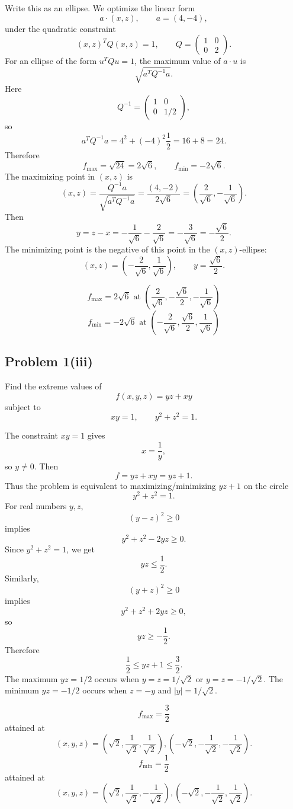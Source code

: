 \documentclass[11pt,a4paper]{article}
\begin{document}
Write this as an ellipse.  We optimize the linear form
\[
 a\cdot (x,z),\qquad a=(4,-4),
\]
under the quadratic constraint
\[
 (x,z)^TQ(x,z)=1,
\qquad Q=\begin{pmatrix}1&0\\0&2\end{pmatrix}.
\]
For an ellipse of the form \(u^TQu=1\), the maximum value of \(a\cdot u\) is
\[
 \sqrt{a^TQ^{-1}a}.
\]
Here
\[
 Q^{-1}=\begin{pmatrix}1&0\\0&1/2\end{pmatrix},
\]
so
\[
 a^TQ^{-1}a=4^2+(-4)^2\frac12=16+8=24.
\]
Therefore
\[
 f_{\max}=\sqrt{24}=2\sqrt6,
\qquad f_{\min}=-2\sqrt6.
\]
The maximizing point in \((x,z)\) is
\[
 (x,z)=\frac{Q^{-1}a}{\sqrt{a^TQ^{-1}a} }
 =\frac{(4,-2)}{2\sqrt6}
 =\left(\frac{2}{\sqrt6},-\frac{1}{\sqrt6}\right).
\]
Then
\[
 y=z-x=-\frac{1}{\sqrt6}-\frac{2}{\sqrt6}=-\frac{3}{\sqrt6}=-\frac{\sqrt6}{2}.
\]
The minimizing point is the negative of this point in the \((x,z)\)-ellipse:
\[
 (x,z)=\left(-\frac{2}{\sqrt6},\frac{1}{\sqrt6}\right),
\qquad y=\frac{\sqrt6}{2}.
\]

\begin{answerbox}
\[
\boxed{f_{\max}=2\sqrt6\text{ at }\left(\frac{2}{\sqrt6},-\frac{\sqrt6}{2},-\frac{1}{\sqrt6}\right)}
\]
\[
\boxed{f_{\min}=-2\sqrt6\text{ at }\left(-\frac{2}{\sqrt6},\frac{\sqrt6}{2},\frac{1}{\sqrt6}\right)}
\]
\end{answerbox}

\subsection{Problem 1(iii)}
Find the extreme values of
\[
 f(x,y,z)=yz+xy
\]
subject to
\[
 xy=1,
\qquad y^2+z^2=1.
\]

The constraint \(xy=1\) gives
\[
 x=\frac1y,
\]
so \(y\neq0\).  Then
\[
 f=yz+xy=yz+1.
\]
Thus the problem is equivalent to maximizing/minimizing \(yz+1\) on the circle
\[
 y^2+z^2=1.
\]
For real numbers \(y,z\),
\[
 (y-z)^2\ge0
\]
implies
\[
 y^2+z^2-2yz\ge0.
\]
Since \(y^2+z^2=1\), we get
\[
 yz\le \frac12.
\]
Similarly,
\[
 (y+z)^2\ge0
\]
implies
\[
 y^2+z^2+2yz\ge0,
\]
so
\[
 yz\ge -\frac12.
\]
Therefore
\[
 \frac12\le yz+1\le \frac32.
\]
The maximum \(yz=1/2\) occurs when \(y=z=1/\sqrt2\) or \(y=z=-1/\sqrt2\).  The minimum \(yz=-1/2\) occurs when \(z=-y\) and \(|y|=1/\sqrt2\).

\begin{answerbox}
\[
\boxed{f_{\max}=\frac32}
\]
attained at
\[
\boxed{(x,y,z)=\left(\sqrt2,\frac1{\sqrt2},\frac1{\sqrt2}\right),
\left(-\sqrt2,-\frac1{\sqrt2},-\frac1{\sqrt2}\right)}.
\]
\[
\boxed{f_{\min}=\frac12}
\]
attained at
\[
\boxed{(x,y,z)=\left(\sqrt2,\frac1{\sqrt2},-\frac1{\sqrt2}\right),
\left(-\sqrt2,-\frac1{\sqrt2},\frac1{\sqrt2}\right)}.
\]
\end{answerbox}
\end{document}
